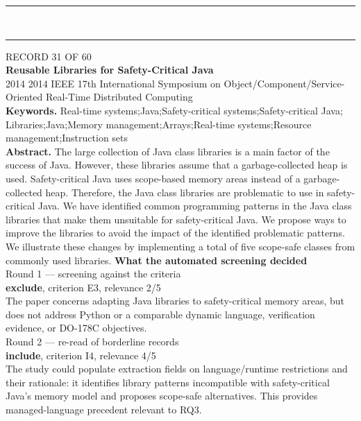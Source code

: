\documentclass[11pt,a4paper]{article}
\begin{document}
\color{rule}\rule{\linewidth}{0.3pt}\\[3mm]\rule{\linewidth}{0.3pt}\color{black}
\clearpage
{\color{soft}\footnotesize RECORD 31 OF 60}\\[1mm]
{\large\bfseries Reusable Libraries for Safety-Critical Java}\\[1.5mm]
{\color{soft}\small 2014 \textperiodcentered{} 2014 IEEE 17th International Symposium on Object/Component/Service-Oriented Real-Time Distributed Computing}\\[2mm]
{\small\textbf{Keywords.} Real-time systems;Java;Safety-critical systems;Safety-critical Java; Libraries;Java;Memory management;Arrays;Real-time systems;Resource management;Instruction sets}\\[2mm]
{\small\textbf{Abstract.} The large collection of Java class libraries is a main factor of the success of Java. However, these libraries assume that a garbage-collected heap is used. Safety-critical Java uses scope-based memory areas instead of a garbage-collected heap. Therefore, the Java class libraries are problematic to use in safety-critical Java. We have identified common programming patterns in the Java class libraries that make them unsuitable for safety-critical Java. We propose ways to improve the libraries to avoid the impact of the identified problematic patterns. We illustrate these changes by implementing a total of five scope-safe classes from commonly used libraries.}
\vspace{3mm}
\vspace{2.5mm}
{\small\textbf{What the automated screening decided}}\\[2mm]
{\footnotesize\color{soft}Round 1 --- screening against the criteria}\\[0.5mm]
{\small\textbf{exclude}, criterion E3, relevance 2/5}\\[0.5mm]
{\small The paper concerns adapting Java libraries to safety-critical memory areas, but does not address Python or a comparable dynamic language, verification evidence, or DO-178C objectives.}\\[2.5mm]
{\footnotesize\color{soft}Round 2 --- re-read of borderline records}\\[0.5mm]
{\small\textbf{include}, criterion I4, relevance 4/5}\\[0.5mm]
{\small The study could populate extraction fields on language/runtime restrictions and their rationale: it identifies library patterns incompatible with safety-critical Java's memory model and proposes scope-safe alternatives. This provides managed-language precedent relevant to RQ3.}\\[2.5mm]
\end{document}
